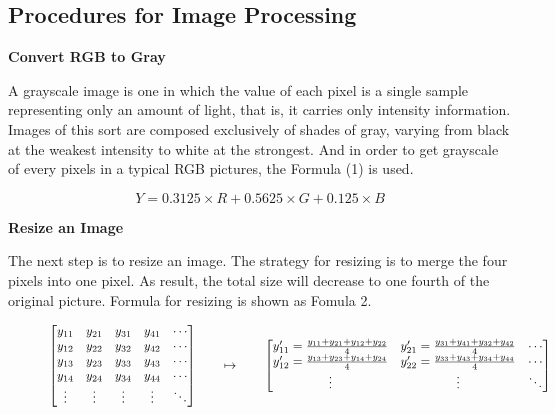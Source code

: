 \documentclass[conference,compsoc]{IEEEtran}
\begin{document}
    \subsection{Procedures for Image Processing}
 
  
    \textbf{Convert RGB to Gray}

    A grayscale image is one in which the value of each pixel is a single sample representing only an amount of light, that is, it carries only intensity information. Images of this sort are composed exclusively of shades of gray, varying from black at the weakest intensity to white at the strongest. And in order to get grayscale of every pixels in a typical RGB pictures, the Formula (1) is used.

  \begin{equation}
 \displaystyle Y = 0.3125 \times R + 0.5625 \times G + 0.125 \times B
  \end{equation}

  \textbf{Resize an Image}

    The next step is to resize an image. The strategy for resizing is to merge the four pixels into one pixel. As result, the total size will decrease to one fourth of the original picture. Formula for resizing is shown as Fomula 2.
    \begin{figure}[h]
  \begin{equation}%
    \centering
    \begin{split}
    \begin{bmatrix}%
      y_{11} & y_{21} & y_{31} & y_{41} & \cdots \\
      y_{12} & y_{22} & y_{32} & y_{42} & \cdots \\
      y_{13} & y_{23} & y_{33} & y_{43} & \cdots \\
      y_{14} & y_{24} & y_{34} & y_{44} & \cdots \\
      \vdots & \vdots & \vdots & \vdots & \ddots
    \end{bmatrix}
    \qquad\mapsto\qquad
    \begin{bmatrix}
      y'_{11} = \frac{y_{11} + y_{21} + y_{12} + y_{22}}{4}
      & y'_{21} = \frac{y_{31} + y_{41} + y_{32} + y_{42}}{4}
      & \cdots \\
      y'_{12} = \frac{y_{13} + y_{23} + y_{14} + y_{24}}{4}
      & y'_{22} = \frac{y_{33} + y_{43} + y_{34} + y_{44}}{4}
      & \cdots \\
      \vdots  & \vdots  & \ddots
    \end{bmatrix}
  \end{split}
  \end{equation}
\end{figure}
  
\end{document}
